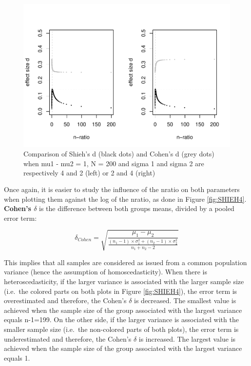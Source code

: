 \documentclass[man,floatsintext]{apa6}
\begin{document}
\begin{figure}
\centering
\includegraphics{The-shieh-s-and-its-relation-with-Cohen-s-d_files/figure-latex/SHIEH3-1.pdf}
\caption{\label{fig:SHIEH3}Comparison of Shieh's d (black dots) and Cohen's d (grey dots) when mu1 - mu2 = 1, N = 200 and sigma 1 and sigma 2 are respectively 4 and 2 (left) or 2 and 4 (right)}
\end{figure}

Once again, it is easier to study the influence of the nratio on both parameters when plotting them against the log of the nratio, as done in Figure \ref{fig:SHIEH4}. \textbf{Cohen's \(\delta\)} is the difference between both groups means, divided by a pooled error term:

\begin{equation} 
\delta_{Cohen}= \sqrt{\frac{\mu_{1}-\mu_{2}}{\frac{(n_{1}-1) \times \sigma^2_{1} + (n_{2}-1) \times \sigma^2_{2}}{n_{1}+n_{2}-2}}}
\label{eq:cohen}
\end{equation}

This implies that all samples are considered as issued from a common population variance (hence the assumption of homoscedasticity). When there is heteroscedasticity, if the larger variance is associated with the larger sample size (i.e.~the colored parts on both plots in Figure \ref{fig:SHIEH4}), the error term is overestimated and therefore, the Cohen's \(\delta\) is decreased. The smallest value is achieved when the sample size of the group associated with the largest variance equals n-1=199. On the other side, if the larger variance is associated with the smaller sample size (i.e.~the non-colored parts of both plots), the error term is underestimated and therefore, the Cohen's \(\delta\) is increased. The largest value is achieved when the sample size of the group associated with the largest variance equals 1.
\end{document}
